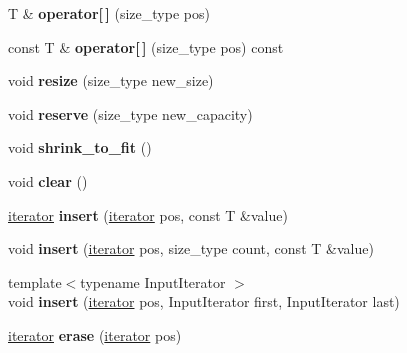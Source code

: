 \begin{DoxyCompactItemize}
T \& {\bfseries operator\mbox{[}$\,$\mbox{]}} (size\+\_\+type pos)
\item 
\mbox{\label{classprevector_a2aa1d5299104878a9e5441459927df72}} 
const T \& {\bfseries operator\mbox{[}$\,$\mbox{]}} (size\+\_\+type pos) const
\item 
\mbox{\label{classprevector_ad2d97a45e0d2872260e868a540d31860}} 
void {\bfseries resize} (size\+\_\+type new\+\_\+size)
\item 
\mbox{\label{classprevector_ab9a34e0210debc65efda453dbd0cbd27}} 
void {\bfseries reserve} (size\+\_\+type new\+\_\+capacity)
\item 
\mbox{\label{classprevector_a3b82afa760e2aabd8373994a1316523e}} 
void {\bfseries shrink\+\_\+to\+\_\+fit} ()
\item 
\mbox{\label{classprevector_a412f07b8bf5485dabe2fe9d6d5dfe763}} 
void {\bfseries clear} ()
\item 
\mbox{\label{classprevector_ad4f368a9aa3f0f650e1b2a0894dafe51}} 
\mbox{\hyperlink{classprevector_1_1iterator}{iterator}} {\bfseries insert} (\mbox{\hyperlink{classprevector_1_1iterator}{iterator}} pos, const T \&value)
\item 
\mbox{\label{classprevector_aede9f795653c38dc88bb5fabd80f7b6f}} 
void {\bfseries insert} (\mbox{\hyperlink{classprevector_1_1iterator}{iterator}} pos, size\+\_\+type count, const T \&value)
\item 
\mbox{\label{classprevector_aa14cdf5ea4f9f9b5256bca10e49e682c}} 
{\footnotesize template$<$typename Input\+Iterator $>$ }\\void {\bfseries insert} (\mbox{\hyperlink{classprevector_1_1iterator}{iterator}} pos, Input\+Iterator first, Input\+Iterator last)
\item 
\mbox{\label{classprevector_a780af143deebcaaecb164fa1a2d98156}} 
\mbox{\hyperlink{classprevector_1_1iterator}{iterator}} {\bfseries erase} (\mbox{\hyperlink{classprevector_1_1iterator}{iterator}} pos)
\item 
\mbox{\label{classprevector_a1bcffc1a855e24c2ac67b11f55d80d5f}} 

\end{DoxyCompactItemize}
